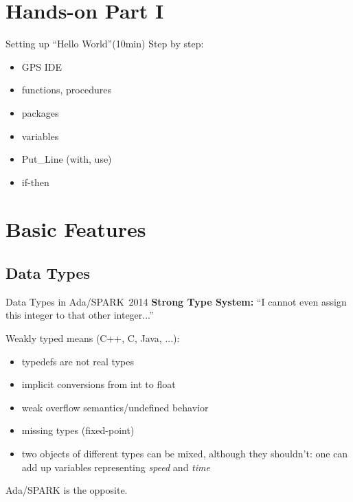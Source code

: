 \section{Hands-on Part I}
\begin{frame}{Setting up ``Hello World''\hfill(10min)}
Step by step:
  \begin{itemize}
  \item GPS IDE
  \item functions, procedures
  \item packages
  \item variables
  \item Put\_Line (with, use)
  \item if-then
  \end{itemize}
\end{frame}
\addtocounter{clock}{10}

\section{Basic Features}
\subsection{Data Types}

\begin{frame}{Data Types in Ada/SPARK~2014}
\textbf{Strong Type System:} ``I cannot even assign this integer to that other integer...''\\\vspace{1em}

Weakly typed means (C++, C, Java, ...):
\begin{itemize}
\item typedefs are not real types
\item implicit conversions from int to float
\item weak overflow semantics/undefined behavior
\item missing types (fixed-point)
\item two objects of different types can be mixed, although they
  shouldn't: one can add up variables representing \emph{speed} and \emph{time}
\end{itemize}
Ada/SPARK is the opposite.
\end{frame}
\addtocounter{clock}{2}

